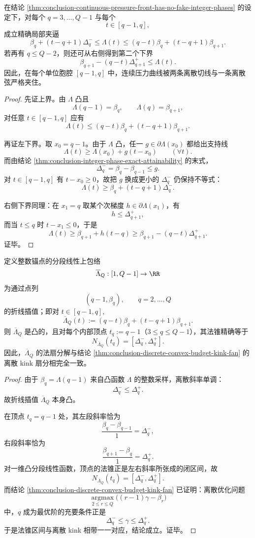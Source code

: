 \begin{theorem}[整数锚点的局部凸插值夹逼]\label{thm:conclusion-integer-anchor-local-convex-interpolation-squeeze}
在结论 \ref{thm:conclusion-continuous-pressure-front-has-no-fake-integer-phases} 的设定下，对每个 \(q=3,\dots,Q-1\) 与每个
\[
t\in[q-1,q],
\]
成立精确局部夹逼
\[
\beta_q+(t-q+1)\Delta_q^-
\le
\Lambda(t)
\le
(q-t)\beta_q+(t-q+1)\beta_{q+1}.
\]
若再有 \(q\le Q-2\)，则还可从右侧得到第二个下界
\[
\beta_{q+1}-(q-t)\Delta_{q+1}^+
\le
\Lambda(t).
\]
因此，在每个单位胞腔 \([q-1,q]\) 中，连续压力曲线被两条离散切线与一条离散弦严格夹住。
\end{theorem}
\begin{proof}
先证上界。由 \(\Lambda\) 凸且
\[
\Lambda(q-1)=\beta_q,\qquad \Lambda(q)=\beta_{q+1},
\]
对任意 \(t\in[q-1,q]\) 应有
\[
\Lambda(t)\le (q-t)\beta_q+(t-q+1)\beta_{q+1}.
\]

再证左下界。取 \(x_0=q-1\)。由于 \(\Lambda\) 凸，任一 \(g\in\partial\Lambda(x_0)\) 都给出支持线
\[
\Lambda(t)\ge \Lambda(x_0)+g(t-x_0)\qquad (\forall t).
\]
而由结论 \ref{thm:conclusion-integer-phase-exact-attainability} 的末式，
\[
\Delta_q^-=\beta_q-\beta_{q-1}\le g.
\]
对 \(t\in[q-1,q]\) 有 \(t-x_0\ge 0\)，故把 \(g\) 换成更小的 \(\Delta_q^-\) 仍保持不等式：
\[
\Lambda(t)\ge \beta_q+(t-q+1)\Delta_q^-.
\]

右侧下界同理：在 \(x_1=q\) 取某个次梯度 \(h\in\partial\Lambda(x_1)\)，有
\[
h\le \Delta_{q+1}^+,
\]
而当 \(t\le q\) 时 \(t-x_1\le 0\)，于是
\[
\Lambda(t)\ge \beta_{q+1}+h(t-q)\ge \beta_{q+1}-(q-t)\Delta_{q+1}^+.
\]
证毕。
\end{proof}

\begin{theorem}\label{thm:conclusion-piecewise-linear-envelope-normal-fan-equals-discrete-kink-fan}
定义整数锚点的分段线性上包络
\[
\overline\Lambda_Q:[1,Q-1]\to\RR
\]
为通过点列
\[
(q-1,\beta_q),\qquad q=2,\dots,Q
\]
的折线插值；即对 \(t\in[q-1,q]\),
\[
\overline\Lambda_Q(t):=(q-t)\beta_q+(t-q+1)\beta_{q+1}.
\]
则 \(\overline\Lambda_Q\) 是凸的，且对每个内部顶点 \(t_q:=q-1\)（\(3\le q\le Q-1\)），其法锥精确等于
\[
N_{\overline\Lambda_Q}(t_q)
=
[\Delta_q^-,\Delta_q^+].
\]
因此，\(\overline\Lambda_Q\) 的法扇分解与结论 \ref{thm:conclusion-discrete-convex-budget-kink-fan} 的离散 kink 扇分相完全一致。
\end{theorem}
\begin{proof}
由于 \(\beta_q=\Lambda(q-1)\) 来自凸函数 \(\Lambda\) 的整数采样，离散斜率单调：
\[
\Delta_q^-\le \Delta_q^+.
\]
故折线插值 \(\overline\Lambda_Q\) 本身凸。

在顶点 \(t_q=q-1\) 处，其左段斜率恰为
\[
\frac{\beta_q-\beta_{q-1}}{1}=\Delta_q^-,
\]
右段斜率恰为
\[
\frac{\beta_{q+1}-\beta_q}{1}=\Delta_q^+.
\]
对一维凸分段线性函数，顶点的法锥正是左右斜率所张成的闭区间，故
\[
N_{\overline\Lambda_Q}(t_q)=[\Delta_q^-,\Delta_q^+].
\]
而结论 \ref{thm:conclusion-discrete-convex-budget-kink-fan} 已证明：离散优化问题
\[
\operatorname*{argmax}_{2\le r\le Q}\bigl((r-1)\gamma-\beta_r\bigr)
\]
中，\(q\) 成为最优阶的充要条件正是
\[
\Delta_q^-\le \gamma\le \Delta_q^+.
\]
于是法锥区间与离散 kink 相带一一对应，结论成立。证毕。
\end{proof}

